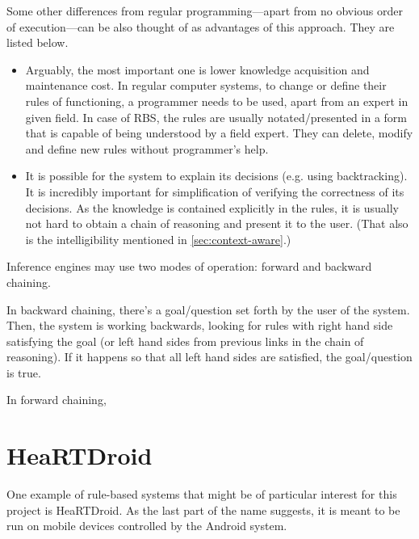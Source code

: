 Some other differences from regular programming---apart from no obvious order of execution---can be also thought of as advantages of this approach. They are listed below.

\begin{itemize}
	\item Arguably, the most important one is lower knowledge acquisition and maintenance cost. In regular computer systems, to change or define their rules of functioning, a programmer needs to be used, apart from an expert in given field. In case of RBS, the rules are usually notated/presented in a form that is capable of being understood by a field expert. They can delete, modify and define new rules without programmer's help.
	\item It is possible for the system to explain its decisions (e.g. using backtracking). It is incredibly important for simplification of verifying the correctness of its decisions. As the knowledge is contained explicitly in the rules, it is usually not hard to obtain a chain of reasoning and present it to the user. (That also is the intelligibility mentioned in \cref{sec:context-aware}.)
\end{itemize}

Inference engines may use two modes of operation: forward and backward chaining.

In backward chaining, there's a goal/question set forth by the user of the system. Then, the system is working backwards, looking for rules with right hand side satisfying the goal (or left hand sides from previous links in the chain of reasoning). If it happens so that all left hand sides are satisfied, the goal/question is true.

In forward chaining, 


\section{HeaRTDroid}

One example of rule-based systems that might be of particular interest for this project is HeaRTDroid. As the last part of the name suggests, it is meant to be run on mobile devices controlled by the Android system.